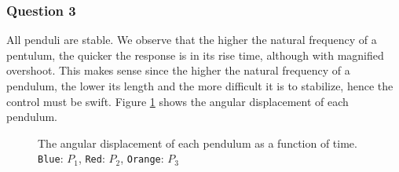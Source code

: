\subsubsection{Question 3}

All penduli are stable. We observe that the higher the natural frequency of a
pentulum, the quicker the response is in its rise time, although with magnified
overshoot. This makes sense since the higher the natural frequency of a
pendulum, the lower its length and the more difficult it is to stabilize, hence
the control must be swift. Figure \ref{fig:3} shows the angular displacement
of each pendulum.

\begin{figure}[H]\centering
  \scalebox{1}{}
  \caption{The angular displacement of each pendulum as a function of time.
    \texttt{Blue}: $P_1$, \texttt{Red}: $P_2$, \texttt{Orange}: $P_3$}
  \label{fig:3}
\end{figure}
